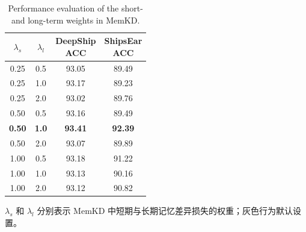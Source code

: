 \documentclass[a4paper, 12pt]{article}
\begin{document}

\begin{table}[htbp]
\centering
\caption{Performance evaluation of the short- and long-term weights in MemKD.}
\label{tab:memkd_weight_analysis}
\small
\setlength{\tabcolsep}{9pt}
\begin{tabular}{c|c|c|c}
\toprule
$\lambda_s$ & $\lambda_l$ &
\makecell{DeepShip\\ACC} &
\makecell{ShipsEar\\ACC} \\
\midrule
0.25 & 0.5 & 93.05 & 89.49 \\
0.25 & 1.0 & 93.17 & 89.23 \\
0.25 & 2.0 & 93.02 & 89.76 \\
0.50 & 0.5 & 93.16 & 89.49 \\
\rowcolor{gray!15}
\textbf{0.50} & \textbf{1.0} & \textbf{93.41} & \textbf{92.39} \\
0.50 & 2.0 & 93.07 & 89.89 \\
1.00 & 0.5 & 93.18 & 91.22 \\
1.00 & 1.0 & 93.13 & 90.16 \\
1.00 & 2.0 & 93.12 & 90.82 \\
\bottomrule
\end{tabular}
\vspace{0.5ex}
\par\footnotesize $\lambda_s$ 和 $\lambda_l$ 分别表示 MemKD 中短期与长期记忆差异损失的权重；灰色行为默认设置。
\end{table}
\end{document}
